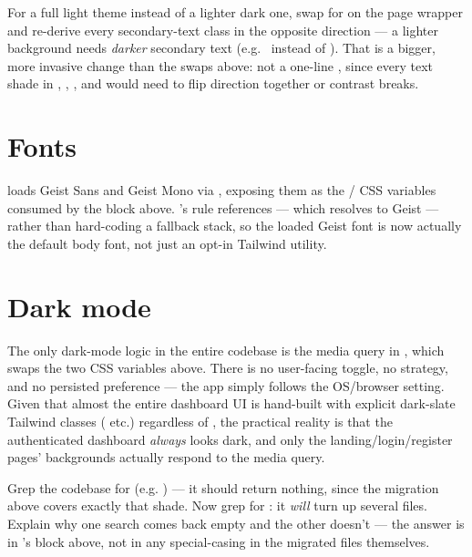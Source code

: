 \begin{olkhowto}
For a full light theme instead of a lighter dark one, swap  for  on the page wrapper and re-derive every secondary-text class in the opposite direction — a lighter background needs \emph{darker} secondary text (e.g.\  instead of ). That is a bigger, more invasive change than the swaps above: not a one-line , since every text shade in , , , and  would need to flip direction together or contrast breaks.
\end{olkhowto}

\section{Fonts}

 loads Geist Sans and Geist Mono via , exposing them as the / CSS variables consumed by the  block above. 's  rule references  — which resolves to Geist — rather than hard-coding a fallback stack, so the loaded Geist font is now actually the default body font, not just an opt-in Tailwind utility.

\section{Dark mode}

The only dark-mode logic in the entire codebase is the  media query in , which swaps the two CSS variables above. There is no user-facing toggle, no  strategy, and no persisted preference — the app simply follows the OS/browser setting. Given that almost the entire dashboard UI is hand-built with explicit dark-slate Tailwind classes ( etc.) regardless of , the practical reality is that the authenticated dashboard \emph{always} looks dark, and only the landing/login/register pages' backgrounds actually respond to the media query.

\begin{olktask}
Grep the codebase for  (e.g. ) — it should return nothing, since the  migration above covers exactly that shade. Now grep for : it \emph{will} turn up several files. Explain why one search comes back empty and the other doesn't — the answer is in 's  block above, not in any special-casing in the migrated files themselves.
\end{olktask}

